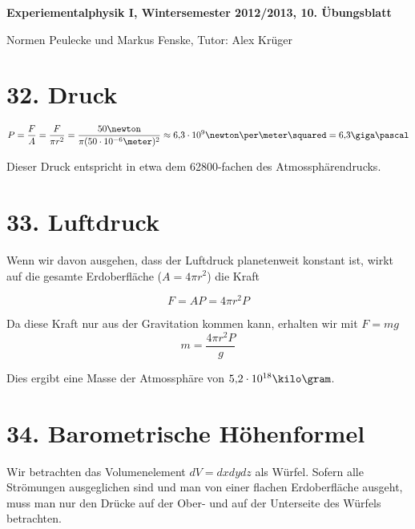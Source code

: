\documentclass[a4paper,german,12pt,smallheadings]{scrartcl}
\begin{document}
\begin{center}
\bfseries %
\sffamily %
\vspace{-40pt}
Experiementalphysik I, Wintersemester 2012/2013, 10. Übungsblatt

Normen Peulecke und Markus Fenske, Tutor: Alex Krüger
\vspace{-10pt}
\end{center}


\section*{32. Druck}

\begin{equation}
  P = \frac{F}{A} = \frac{F}{\pi r^2} = \frac{50 \newton}{\pi (50 \cdot 10^{-6} \meter)^2} \approx 6{,}3 \cdot 10^9 \newton\per\meter\squared = 6{,}3 \giga\pascal 
\end{equation}

Dieser Druck entspricht in etwa dem 62800-fachen des Atmossphärendrucks.

\section*{33. Luftdruck}

Wenn wir davon ausgehen, dass der Luftdruck planetenweit konstant ist, wirkt
auf die gesamte Erdoberfläche ($A = 4 \pi r^2$) die Kraft

\begin{equation}
  F = AP = 4 \pi r^2 P
\end{equation}

Da diese Kraft nur aus der Gravitation kommen kann, erhalten wir mit $F = mg$
\begin{equation}
  m = \frac{4 \pi r^2 P}{g}
\end{equation}

Dies ergibt eine Masse der Atmossphäre von $5{,}2 \cdot 10^{18} \kilo\gram$.

\section*{34. Barometrische Höhenformel}

Wir betrachten das Volumenelement $dV = dxdydz$ als Würfel. Sofern alle
Strömungen ausgeglichen sind und man von einer flachen Erdoberfläche ausgeht,
muss man nur den Drücke auf der Ober- und auf der Unterseite des Würfels
betrachten.
\end{document}
